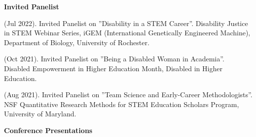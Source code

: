 {\large \bf Invited Panelist}
\begin{etaremune}

\item \meb (Jul 2022). Invited Panelist on ''Disability in a STEM Career''. Disability Justice in STEM Webinar Series, iGEM (International Genetically Engineered Machine), Department of Biology, University of Rochester.
%
\item \meb (Oct 2021). Invited Panelist on ''Being a Disabled Woman in Academia''. Disabled Empowerment in Higher Education Month, Disabled in Higher Education.
%
\item \meb (Aug 2021). Invited Panelist on ''Team Science and Early-Career Methodologists''. NSF Quantitative Research Methods for STEM Education Scholars Program, University of Maryland.%
\end{etaremune}
{\large {\bf Conference Presentations}}
